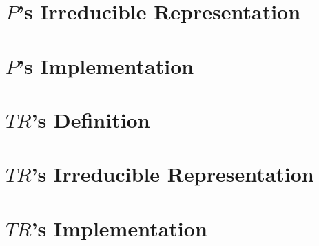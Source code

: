 \documentclass[12pt]{revtex4-2}
\begin{document}
\section{$P$'s Irreducible Representation}
\section{$P$'s Implementation}

\section{$TR$'s Definition}
\section{$TR$'s Irreducible Representation}
\section{$TR$'s Implementation}
\end{document}
